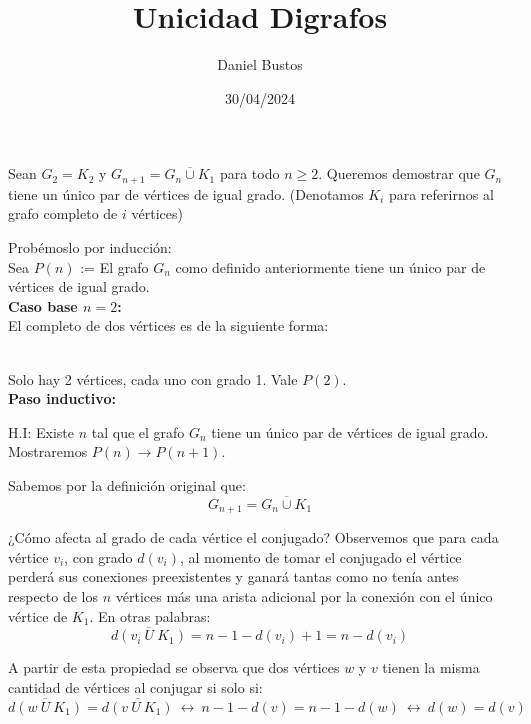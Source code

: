 \documentclass{article}
\author{Daniel Bustos}
\title{Unicidad Digrafos}
\date{30/04/2024}
\begin{document}
\maketitle


Sean $G_2 = K_2$ y $G_{n+1} = \overline{G_n \cup K_1}$ para todo $n \geq 2$. Queremos demostrar que $G_n$ tiene un único par de vértices de igual grado. (Denotamos $K_i$ para referirnos al grafo completo de $i$ vértices)

Probémoslo por inducción:\\

Sea $P(n)$ := El grafo $G_n$ como definido anteriormente tiene un único par de vértices de igual grado.\\

\textbf{Caso base $n = 2$:}\\

El completo de dos vértices es de la siguiente forma:
 \\

Solo hay 2 vértices, cada uno con grado 1. Vale $P(2)$.\\

\textbf{Paso inductivo:}

H.I: Existe $n$ tal que el grafo $G_n$ tiene un único par de vértices de igual grado. Mostraremos $P(n) \rightarrow P(n+1)$.

Sabemos por la definición original que:
\[ G_{n+1} = \overline{G_n \cup K_1} \]

¿Cómo afecta al grado de cada vértice el conjugado? Observemos que para cada vértice $v_i$, con grado $d(v_i)$, al momento de tomar el conjugado el vértice perderá sus conexiones preexistentes y ganará tantas como no tenía antes respecto de los $n$ vértices más  una arista adicional por la conexión con el único vértice de $K_1$. En otras palabras:
\[ \overline{d(v_i \ U\  K_1)} = n - 1 -d(v_i) + 1 = n - d(v_i) \]

A partir de esta propiedad se observa que dos vértices $w$ y $v$ tienen la misma cantidad de vértices al conjugar si solo si:
\[ \overline{d(w \ U\  K_1)} = \overline{d(v \ U\  K_1)} \  \leftrightarrow \ n - 1 - d(v) = n - 1 - d(w) \  \leftrightarrow  \ d(w) = d(v) \]
\end{document}
